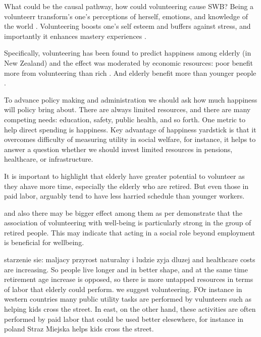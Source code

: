 \documentclass[10pt, letterpaper]{article}
\begin{document}
\begin{spacing}{1.4}
What could be the causal pathway, how could volunteering cause SWB? Being a
volunteerr transform's one's perceptions of herself, emotions, and knowledge of
the world \citep{wilson12B}. %
Volunteering boosts one's self esteem and buffers against stress, and
importantly it enhances mastery experiences
\citep{wilson12B}. %


Specifically, volunteering has been found to predict happiness among elderly (in
New Zealand) and the effect was moderated by
economic resources: poor benefit more from volunteering than rich
\citep{dulin2012volunteering}. And elderly benefit more than  younger people \citep{van2000differential}. 

To advance policy making and
administration we should ask how much happiness will policy bring
about. There are always limited resources, and there are many competing needs: education, safety, public
health, and so forth. One metric to help direct spending is happiness.
Key  advantage of happiness yardstick is that it overcomes difficulty
of measuring utility in social welfare, for instance, it helps to answer
a question whether we should  invest
limited resources in pensions, healthcare, or infrastructure.



It is important to highlight that elderly have greater potential to volunteer as
they ahave more time, especially the elderly who are retired. But even those in
paid labor, arguably tend to have less harried schedule than younger workers.

and also there may be bigger effect among them as per \citep{wahrendorf06}
demonstrate that the association of
volunteering with well-being is particularly strong in the
group of retired people. This may indicate that acting in
a social role beyond employment is beneficial for wellbeing.


starzenie sie: maljacy przyrost naturalny i ludzie zyja dluzej and healthcare
costs are increasing. So people live longer and in better shape, and at the same
time retirement age increase is opposed, so there is more untapped resources in
terms of labor that elderly could perform. we suggest volunteering. FOr instance
in western countries many public utility tasks are performed by vulunteers such
as helping kids cross the street. In east, on the other hand, these activities
are often performed by paid labor that could be used better elesewhere, for
instance in poland Straz Miejska helps kids cross the street. %




\end{spacing}
\end{document}
